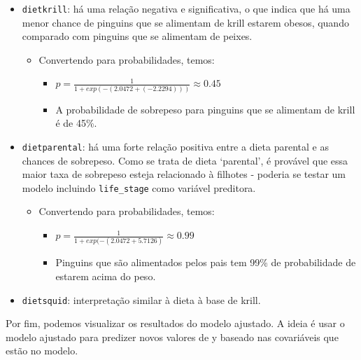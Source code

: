 \documentclass[
]{book}
\providecommand{\tightlist}{%
  \setlength{\itemsep}{0pt}\setlength{\parskip}{0pt}}
\begin{document}
\begin{itemize}
\tightlist
\item
  \texttt{dietkrill}: há uma relação negativa e significativa, o que indica que há uma menor chance de pinguins que se alimentam de krill estarem obesos, quando comparado com pinguins que se alimentam de peixes.

  \begin{itemize}
  \tightlist
  \item
    Convertendo para probabilidades, temos:

    \begin{itemize}
    \tightlist
    \item
      \(p = \frac{1}{1+exp(-(2.0472 + (-2.2294)))}  \approx 0.45\)
    \item
      A probabilidade de sobrepeso para pinguins que se alimentam de krill é de 45\%.
    \end{itemize}
  \end{itemize}
\end{itemize}

\begin{itemize}
\tightlist
\item
  \texttt{dietparental}: há uma forte relação positiva entre a dieta parental e as chances de sobrepeso. Como se trata de dieta `parental', é provável que essa maior taxa de sobrepeso esteja relacionado à filhotes - poderia se testar um modelo incluindo \texttt{life\_stage} como variável preditora.

  \begin{itemize}
  \tightlist
  \item
    Convertendo para probabilidades, temos:

    \begin{itemize}
    \tightlist
    \item
      \(p = \frac{1}{1+exp(-(2.0472 + 5.7126)}  \approx 0.99\)
    \item
      Pinguins que são alimentados pelos pais tem 99\% de probabilidade de estarem acima do peso.
    \end{itemize}
  \end{itemize}
\end{itemize}

\begin{itemize}
\tightlist
\item
  \texttt{dietsquid}: interpretação similar à dieta à base de krill.
\end{itemize}

Por fim, podemos visualizar os resultados do modelo ajustado.
A ideia é usar o modelo ajustado para predizer novos valores de y baseado nas covariáveis que estão no modelo.
\end{document}
